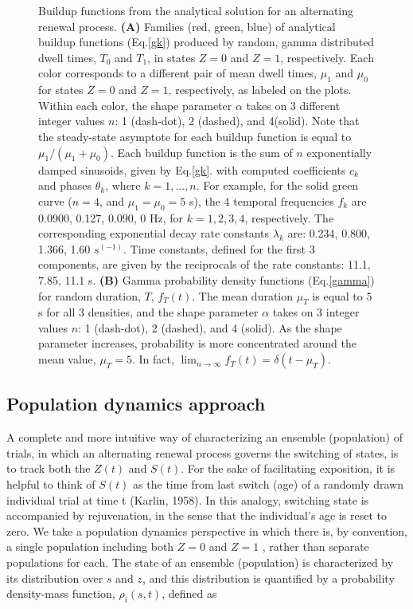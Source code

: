 \begin{figure}
	\caption{Buildup functions from the analytical solution for an alternating renewal process. \textbf{(A)} Families (red, green, blue) of analytical buildup functions (Eq.\ref{gk}) produced by random, gamma distributed dwell times, $T_0$ and $T_1$, in states $Z=0$ and $Z=1$, respectively. Each color corresponds to a different pair of mean dwell times, $\mu_1$ and $\mu_0$ for states $Z=0$ and $Z=1$, respectively, as labeled on the plots. Within each color, the shape parameter $\alpha$ takes on 3 different integer values $n$: 1 (dash-dot), 2 (dashed), and 4(solid). Note that the steady-state asymptote for each buildup function is equal to $\mu_1/(\mu_1+\mu_0)$. Each buildup function is the sum of $n$ exponentially damped sinusoids, given by Eq.\ref{gk}. with computed coefficients $c_k$ and phases $\theta_k$, where $k=1,...,n$. For example, for the solid green curve ($n=4$, and $\mu_1=\mu_0=5$ s), the 4 temporal frequencies $f_k$ are 0.0900, 0.127, 0.090, 0 Hz, for $k=1,2,3,4$, respectively. The corresponding exponential decay rate constants $\lambda_k$ are: 0.234, 0.800, 1.366, 1.60 $s^(-1)$. Time constants, defined for the first 3 components, are given by the reciprocals of the rate constants: 11.1, 7.85, 11.1 s. \textbf{(B)} Gamma probability density functions (Eq.\ref{gamma}) for random duration, $T$, $f_T (t)$. The mean duration $\mu_T$ is equal to 5 s for all 3 densities, and the shape parameter $\alpha$ takes on 3 integer values $n$: 1 (dash-dot), 2 (dashed), and 4 (solid). As the shape parameter increases, probability is more concentrated around the mean value, $\mu_T=5$. In fact, $\lim_{n \to \infty} f_T(t) = \delta(t-\mu_T)$.}
	\label{fig:BUFs}
\end{figure}

\subsection{Population dynamics approach}

A complete and more intuitive way of characterizing an ensemble (population) of trials, in which an alternating renewal process governs the switching of states, is to track both the $Z(t)$ and $S(t)$. For the sake of facilitating exposition, it is helpful to think of $S(t)$ as the time from last switch (age) of a randomly drawn individual trial at time t (Karlin, 1958). In this analogy, switching state is accompanied by rejuvenation, in the sense that the individual’s age is reset to zero. We take a population dynamics perspective in which there is, by convention, a single population including both $Z=0$ and $Z=1$ , rather than separate populations for each. The state of an ensemble (population) is characterized by its distribution over $s$ and $z$, and this distribution is quantified by a probability density-mass function, $\rho_i (s,t)$, defined as

